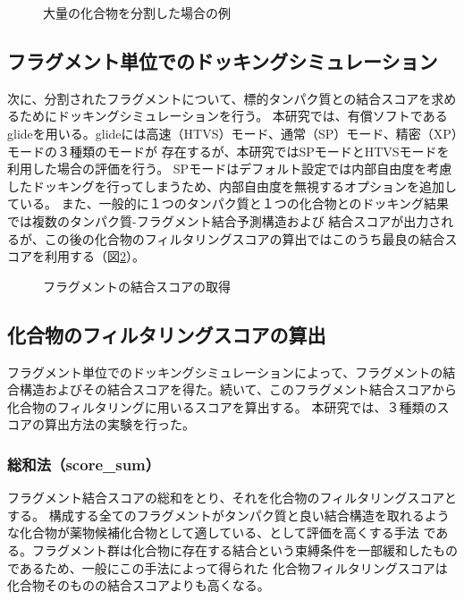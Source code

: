 \begin{figure}[htp]
 \begin{center}
  \caption{大量の化合物を分割した場合の例}
  \label{fig:decomposition_amount}
 \end{center}
\end{figure}

\subsection{フラグメント単位でのドッキングシミュレーション}
次に、分割されたフラグメントについて、標的タンパク質との結合スコアを求めるためにドッキングシミュレーションを行う。
本研究では、有償ソフトであるglide\citetodo{}を用いる。glideには高速（HTVS）モード、通常（SP）モード、精密（XP）モードの３種類のモードが
存在するが、本研究ではSPモードとHTVSモードを利用した場合の評価を行う。
SPモードはデフォルト設定では内部自由度を考慮したドッキングを行ってしまうため、内部自由度を無視するオプションを追加している。
また、一般的に１つのタンパク質と１つの化合物とのドッキング結果では複数のタンパク質-フラグメント結合予測構造および
結合スコアが出力されるが、この後の化合物のフィルタリングスコアの算出ではこのうち最良の結合スコアを利用する（図\ref{fig:fragment_result}）。

\begin{figure}[htp]
 \begin{center}
  \caption{フラグメントの結合スコアの取得}
  \label{fig:fragment_result}
 \end{center}
\end{figure}

\subsection{化合物のフィルタリングスコアの算出}
フラグメント単位でのドッキングシミュレーションによって、フラグメントの結合構造およびその結合スコアを得た。続いて、このフラグメント結合スコアから
化合物のフィルタリングに用いるスコアを算出する。
本研究では、３種類のスコアの算出方法の実験を行った。

\subsubsection{総和法（score\_sum）}
フラグメント結合スコアの総和をとり、それを化合物のフィルタリングスコアとする。
構成する全てのフラグメントがタンパク質と良い結合構造を取れるような化合物が薬物候補化合物として適している、として評価を高くする手法
である。フラグメント群は化合物に存在する結合という束縛条件を一部緩和したものであるため、一般にこの手法によって得られた
化合物フィルタリングスコアは化合物そのものの結合スコアよりも高くなる。

